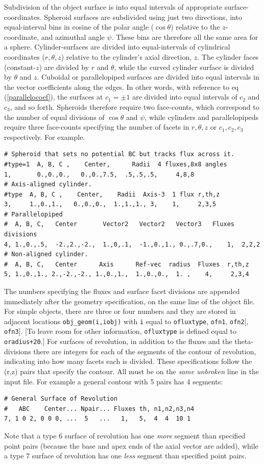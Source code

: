 \documentclass[12pt]{article}
\begin{document}
Subdivision of the object surface is into equal intervals of
appropriate surface-coordinates. Spheroid surfaces are subdivided
using just two directions, into equal-interval bins in cosine of the
polar angle ($\cos\theta$) relative to the $z$-coordinate, and
azimuthal angle $\psi$. These bins are therefore all the same
area for a sphere. Cylinder-surfaces are divided into equal-intervals of
cylindrical coordinates ($r,\theta,z$) relative to the cylinder's
axial direction, $z$. The cylinder faces (constant-$z$) are divided by
$r$ and $\theta$, while the curved cylinder surface is divided by
$\theta$ and $z$. Cuboidal or parallelopiped surfaces are divided
into equal intervals in the vector coefficients along the edges. In
other words, with reference to eq (\ref{parallelocoef}), the surfaces
at $c_1=\pm1$ are divided into equal intervals of $c_2$ and $c_3$, and
so forth. Spheroids therefore require two face-counts, which
correspond to the number of equal divisions of $\cos\theta$ and
$\psi$, while cylinders and parallelopipeds require three face-counts
specifying the number of facets in $r,\theta,z$ or $c_1,c_2,c_3$
respectively. For example.

\begin{verbatim}
# Spheroid that sets no potential BC but tracks flux across it.
#type=1  A, B, C ,    Center,      Radii  4 fluxes,8x8 angles
1,       0.,0.,0.,   0.,0.,7.5,  .5,.5,.5,     4,8,8
# Axis-aligned cylinder.
#type  A, B, C ,    Center,    Radii  Axis-3  1 flux r,th,z
3,     1.,0.,1.,   0.,0.,0.,  1.,1.,1., 3,    1,     2,3,5
# Parallelopiped
#  A, B, C,   Center       Vector2   Vector2   Vector3   Fluxes divisions
4, 1.,0.,.5,  -2.,2.,-2.,  1.,0,.1,  -1.,0.,1., 0.,.7,0.,    1,  2,2,2
# Non-aligned cylinder.
#  A, B, C,   Center      Axis      Ref-vec  radius  Fluxes  r,th,z
5, 1.,0.,1., 2.,-2.,-2., 1.,0.,1.,  1.,0.,0.,  1. ,    4,     2,3,4
\end{verbatim}

The numbers specifying the fluxes and surface facet divisions are
appended immediately after the geometry specification, on the same
line of the object file. For simple objects, there are three or four
numbers and they are stored in adjacent locations
\verb!obj_geom(i,iobj)! with \verb!i!  equal to \verb!ofluxtype!,
\verb!ofn1!, \verb!ofn2![, \verb!ofn3!].  [To leave room for other
information, \verb!ofluxtype!  is defined equal to \verb!oradius+20!.]
For surfaces of revolution, in addition to the fluxes and the
theta-divisions there are integers for each of the segments of the
contour of revolution, indicating into how many facets each is
divided. These specifications follow the (r,z) pairs that specify the
contour. All must be on the \emph{same unbroken} line in the
input file. For example a general contour with 5 pairs has 4 segments:
\begin{verbatim}
# General Surface of Revolution
#   ABC    Center... Npair... Fluxes th, n1,n2,n3,n4
7, 1 0 2, 0 0 0, ...  5   ...   1,   5,  4  4  10 1 
\end{verbatim}
Note that a type 6 surface of revolution has one \emph{more} segment
than specified point pairs (because the base and apex ends of the
axial vector are added), while a type 7 surface of revolution has one
\emph{less} segment than specified point pairs. 
\end{document}
